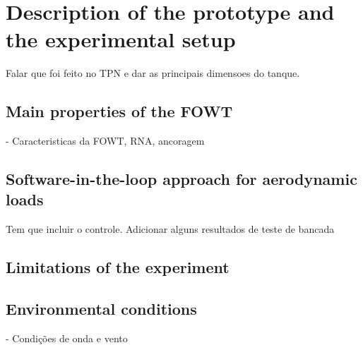\section{Description of the prototype and the experimental setup}
Falar que foi feito no TPN e dar as principais dimensoes do tanque.

\subsection{Main properties of the FOWT}
- Caracteristicas da FOWT, RNA, ancoragem

\subsection{Software-in-the-loop approach for aerodynamic loads}
Tem que incluir o controle. Adicionar alguns resultados de teste de bancada

\subsection{Limitations of the experiment}

\subsection{Environmental conditions}
- Condições de onda e vento